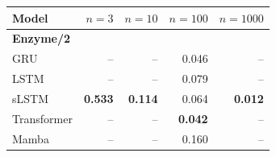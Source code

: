 \begin{tabular*}{\linewidth}{@{\extracolsep{\fill}}lrrrr}
\toprule
Model & $n=3$ & $n=10$ & $n=100$ & $n=1000$ \\
\midrule
\multicolumn{5}{l}{\textbf{Enzyme/2}} \\
GRU & -- & -- & 0.046 & -- \\
LSTM & -- & -- & 0.079 & -- \\
sLSTM & \textbf{0.533} & \textbf{0.114} & 0.064 & \textbf{0.012} \\
Transformer & -- & -- & \textbf{0.042} & -- \\
Mamba & -- & -- & 0.160 & -- \\
\bottomrule
\end{tabular*}
